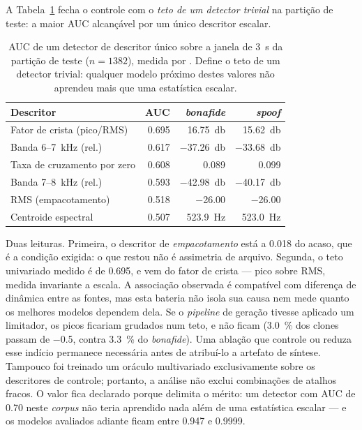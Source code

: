 \documentclass[12pt,a4paper]{article}
\begin{document}
A Tabela~\ref{tab:descritor_unico} fecha o controle com o \emph{teto de um
	detector trivial} na partição de teste: a maior AUC alcançável por um único
descritor escalar.

\begin{table}[H]
	\centering
	\caption[Teto de um detector de descritor único na partição de teste]{AUC de um
		detector de descritor único sobre a janela de \SI{3}{\second} da partição de
		teste ($n = \num{1382}$), medida por
		. Define o teto de um
		detector trivial: qualquer modelo próximo destes valores não aprendeu mais que
		uma estatística escalar.}
	\label{tab:descritor_unico}
	\small\singlespacing
	\begin{tabular}{@{}lrrr@{}}
		\toprule
		\textbf{Descritor} & \textbf{AUC} & \textbf{\textit{bonafide}} &
		\textbf{\textit{spoof}} \\
		\midrule
		Fator de crista (pico/RMS)      & \num{0,695} & \SI{16,75}{\decibel} & \SI{15,62}{\decibel} \\
		Banda \num{6}--\SI{7}{\kilo\hertz} (rel.) & \num{0,617} & \SI{-37,26}{\decibel} & \SI{-33,68}{\decibel} \\
		Taxa de cruzamento por zero     & \num{0,608} & \num{0,089} & \num{0,099} \\
		Banda \num{7}--\SI{8}{\kilo\hertz} (rel.) & \num{0,593} & \SI{-42,98}{\decibel} & \SI{-40,17}{\decibel} \\
		RMS (empacotamento)             & \num{0,518} & \SI{-26,00}{\dBFS} & \SI{-26,00}{\dBFS} \\
		Centroide espectral             & \num{0,507} & \SI{523,9}{\hertz} & \SI{523,0}{\hertz} \\
		\bottomrule
	\end{tabular}
\end{table}

Duas leituras. Primeira, o descritor de \emph{empacotamento} está a
\num{0,018} do acaso, que é a condição exigida: o que restou não é assimetria
de arquivo. Segunda, o teto
univariado medido é de \num{0,695}, e vem do fator de crista --- pico sobre RMS, medida
invariante a escala. A associação observada é compatível com diferença de
dinâmica entre as fontes, mas esta bateria não isola sua causa nem mede quanto
os melhores modelos dependem dela. Se o \textit{pipeline} de geração tivesse
aplicado um limitador, os picos ficariam grudados num teto, e não ficam
(\SI{3,0}{\percent} dos clones passam de \SI{-0,5}{\dBFS}, contra
\SI{3,3}{\percent} do \textit{bonafide}). Uma ablação que controle ou reduza
esse indício permanece necessária antes de atribuí-lo a artefato de síntese.
Tampouco foi treinado um oráculo multivariado exclusivamente sobre os
descritores de controle; portanto, a análise não exclui combinações de atalhos
fracos. O valor fica declarado porque delimita o mérito:
um detector com AUC de \num{0,70} neste \textit{corpus} não teria aprendido
nada além de uma estatística escalar --- e os modelos avaliados adiante ficam
entre \num{0,947} e \num{0,9999}.
\end{document}
